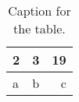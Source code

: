 \documentclass{article}
\begin{document}
\begin{table}[h!]
  \begin{center}
    \caption{Caption for the table.}
    \label{tab:table1}
    \begin{tabular}{l|c||r}
     2&3 & 19\\
      \hline
      a & b & c\\
    \end{tabular}
  \end{center}
\end{table}
\end{document}
